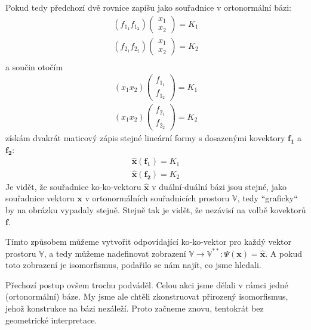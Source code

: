 \documentclass[a5paper,12pt]{amsbook}
\theoremstyle{definition}
\newcommand{\myvec}[1]{\mathbf{#1}}
\newcommand{\myspace}[1]{\mathbb{#1}}
\newcommand{\mydouble}[1]{\myspace{#1^{**}}}
\newcommand{\mycocovec}[1]{\myvec{\widehat{#1}}}
\begin{document}
Pokud tedy předchozí dvě rovnice zapíšu jako souřadnice v ortonormální bázi:
\begin{equation*}
\begin{split}
\left(f_{1_1} f_{1_2}\right)\left(\begin{array}{c}
x_1 \\
x_2\end{array}\right) = K_1 \\
\left(f_{2_1} f_{2_2}\right)\left(\begin{array}{c}
x_1 \\
x_2\end{array}\right) = K_2 \\
\end{split}
\end{equation*}
a součin otočím
\begin{equation*}
\begin{split}
\left(x_1 x_2\right)\left(\begin{array}{c}
f_{1_1} \\
f_{1_2}\end{array}\right) = K_1 \\
\left(x_1 x_2\right)\left(\begin{array}{c}
f_{2_1} \\
f_{2_2}\end{array}\right) = K_2
\end{split}
\end{equation*}
získám dvakrát maticový zápis stejné lineární formy s dosazenými kovektory $\myvec{f_1}$ a $\myvec{f_2}$:
\begin{equation*}
\begin{split}
\mycocovec{x}(\myvec{f_1}) = K_1 \\
\mycocovec{x}(\myvec{f_2}) = K_2
\end{split}
\end{equation*}
Je vidět, že souřadnice ko-ko-vektoru $\mycocovec{x}$ v duální-duální bázi jsou stejné, jako souřadnice
vektoru $\myvec{x}$ v ortonormálních souřadnicích prostoru $\myspace{V}$, tedy ``graficky`` by na obrázku
vypadaly stejně. Stejně tak je vidět, že nezávisí na volbě kovektorů $\myvec{f}$.

Tímto způsobem můžeme vytvořit odpovídající ko-ko-vektor pro každý vektor prostoru $\myspace{V}$, a tedy
můžeme nadefinovat zobrazení $\myspace{V}\rightarrow\mydouble{V}: \Psi(\myvec{x}) = \mycocovec{x}$.
A pokud toto zobrazení je isomorfismus, podařilo se nám najít, co jsme hledali.

\medskip\noindent
Přechozí postup ovšem trochu podváděl. Celou akci jsme dělali v rámci jedné (ortonormální) báze. My jsme
ale chtěli zkonstruovat přirozený isomorfismus, jehož konstrukce na bázi nezáleží. Proto začneme znovu,
tentokrát bez geometrické interpretace.
\end{document}
